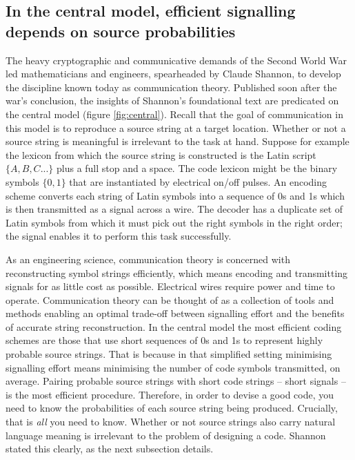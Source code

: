 \documentclass[12pt]{article}
\begin{document}
\subsection{In the central model, efficient signalling depends on source probabilities}
The heavy cryptographic and communicative demands of the Second World War led mathematicians and engineers, spearheaded by Claude Shannon, to develop the discipline known today as communication theory.
Published soon after the war's conclusion, the insights of Shannon's foundational text \parencite*{shannon1948mathematicalc} are predicated on the central model (figure \ref{fig:central}).
Recall that the goal of communication in this model is to reproduce a source string at a target location.
Whether or not a source string is meaningful is irrelevant to the task at hand.
Suppose for example the lexicon from which the source string is constructed is the Latin script $\{A,B,C...\}$ plus a full stop and a space.
The code lexicon might be the binary symbols $\{0,1\}$ that are instantiated by electrical on/off pulses.
An encoding scheme converts each string of Latin symbols into a sequence of 0s and 1s which is then transmitted as a signal across a wire.
The decoder has a duplicate set of Latin symbols from which it must pick out the right symbols in the right order; the signal enables it to perform this task successfully.

As an engineering science, communication theory is concerned with reconstructing symbol strings efficiently, which means encoding and transmitting signals for as little cost as possible.
Electrical wires require power and time to operate.
Communication theory can be thought of as a collection of tools and methods enabling an optimal trade-off between signalling effort and the benefits of accurate string reconstruction.
In the central model the most efficient coding schemes are those that use short sequences of 0s and 1s to represent highly probable source strings.
That is because in that simplified setting minimising signalling effort means minimising the number of code symbols transmitted, on average.
Pairing probable source strings with short code strings -- short signals -- is the most efficient procedure.
Therefore, in order to devise a good code, you need to know the probabilities of each source string being produced.
Crucially, that is \textit{all} you need to know.
Whether or not source strings also carry natural language meaning is irrelevant to the problem of designing a code.
Shannon stated this clearly, as the next subsection details.
\end{document}
